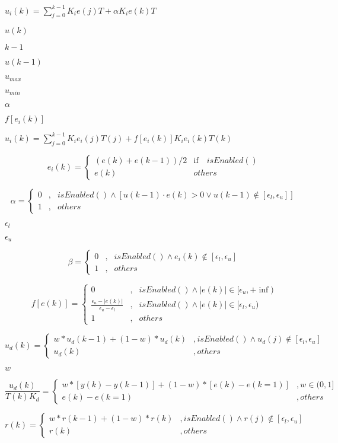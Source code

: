 \documentclass{article}
\begin{document}
$u_i(k)=\sum_{j=0}^{k-1}K_ie(j)T+\alpha K_ie(k)T$
\pagebreak

$u(k)$
\pagebreak

$k-1$
\pagebreak

$u(k-1)$
\pagebreak

$u_{max}$
\pagebreak

$u_{min}$
\pagebreak

$\alpha$
\pagebreak

$f[e_i(k)]$
\pagebreak

$ u_i(k)=\sum_{j=0}^{k-1}K_i e_i(j) T(j)+ f[e_i(k)]K_i e_i(k) T(k) $
\pagebreak

\[
e_i(k)=\begin{cases}
\left ( e(k)+e(k-1) \right )/2&\text{if} \quad isEnabled()\\
e(k)& others
\end{cases}
\]
\pagebreak

\[
\alpha=\begin{cases}
0 &,&isEnabled() \wedge  \left [ u(k-1)\cdot e(k)>0 \vee  u(k-1)\notin \left [\epsilon_l ,\epsilon_u \right] \right ] \\
1 &,&others
\end{cases}
\]
\pagebreak

$\epsilon_l$
\pagebreak

$\epsilon_u$
\pagebreak

\[
\beta=\begin{cases}
0&,&isEnabled() \wedge e_i(k) \notin \left [\epsilon_l ,\epsilon_u \right]  \\
1&,&others
\end{cases}
\]
\pagebreak

\[
f[e(k)]=\begin{cases}
0&,& isEnabled() \wedge |e(k)| \in [\epsilon_u,+\inf)\\
\frac{\epsilon_u- |e(k)| }{\epsilon_u-\epsilon_l}&,&isEnabled() \wedge |e(k)| \in [\epsilon_l,\epsilon_u)\\
1&,& others
\end{cases}
\]
\pagebreak

\[
u_d(k)=\begin{cases}
w*u_d(k-1)+(1-w)*u_d(k)  & ,  isEnabled() \wedge u_d(j) \notin \left [ \epsilon_l,\epsilon_u \right ]   \\
u_d(k)  & ,others
\end{cases}
\]
\pagebreak

$w$
\pagebreak

\[\frac{u_d(k)}{T(k)K_d}=\begin{cases}
w*[y(k)-y(k-1)]+(1-w)*[e(k)-e(k=1)]  & ,  w \in (0,1]   \\
e(k)-e(k=1)  & ,others
\end{cases}
\]
\pagebreak

\[
r(k)=\begin{cases}
w*r(k-1)+(1-w)*r(k)  & ,  isEnabled() \wedge r(j) \notin \left [ \epsilon_l,\epsilon_u \right ]   \\
r(k)  & ,others
\end{cases}
\]
\pagebreak
\end{document}
